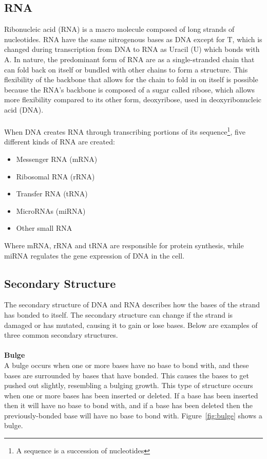 \subsection{RNA}
Ribonucleic acid (RNA) is a macro molecule composed of long strands of 
nucleotides. RNA have the same nitrogenous bases as DNA except for T, which is 
changed during transcription from DNA to RNA as Uracil (U) which bonds with 
A. In nature, the predominant form of RNA are as a single-stranded chain that 
can fold back on itself or bundled with other chains to form a structure. This 
flexibility of the backbone that allows for the chain to fold in on itself is 
possible because the RNA's backbone is composed of a sugar called ribose, which 
allows more flexibility compared to its other form, deoxyribose, used in 
deoxyribonucleic acid (DNA).\\\\
When DNA creates RNA through transcribing portions of its sequence\footnote{A 
sequence is a succession of nucleotides}, five different kinds of RNA are 
created\cite[p. 236, table 7-1]{alberts}:
\begin{itemize}
\item Messenger RNA (mRNA)
\item Ribosomal RNA (rRNA)
\item Transfer RNA (tRNA)
\item MicroRNAs (miRNA)
\item Other small RNA
\end{itemize}
Where mRNA, rRNA and tRNA are responsible for protein synthesis, while miRNA 
regulates the gene expression of DNA in the cell.
\subsection{Secondary Structure}\label{structs}
The secondary structure of DNA and RNA describes how the bases of the 
strand has bonded to itself. The secondary structure can change if 
the strand is damaged or has mutated, causing it to gain or lose 
bases. Below are examples of three common secondary structures.\\\\
\textbf{Bulge}\\ 
A bulge occurs when one or more bases have no base to bond with, and these 
bases are surrounded by bases that have bonded. This causes the bases to get 
pushed out slightly, resembling a bulging growth. This type of structure occurs 
when one or more bases has been inserted or deleted. If a base has been 
inserted then it will have no base to bond with, and if a base has been deleted 
then the previously-bonded base will have no base to bond with. Figure~\ref{fig:bulge} shows a bulge.

